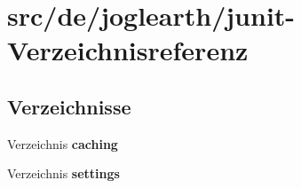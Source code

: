 \section{src/de/joglearth/junit-\/\-Verzeichnisreferenz}
\label{dir_7c6849b11c70986d77856fe133afe8c3}
\subsection*{Verzeichnisse}
\begin{DoxyCompactItemize}
\item 
Verzeichnis {\bf caching}
\item 
Verzeichnis {\bf settings}
\end{DoxyCompactItemize}

